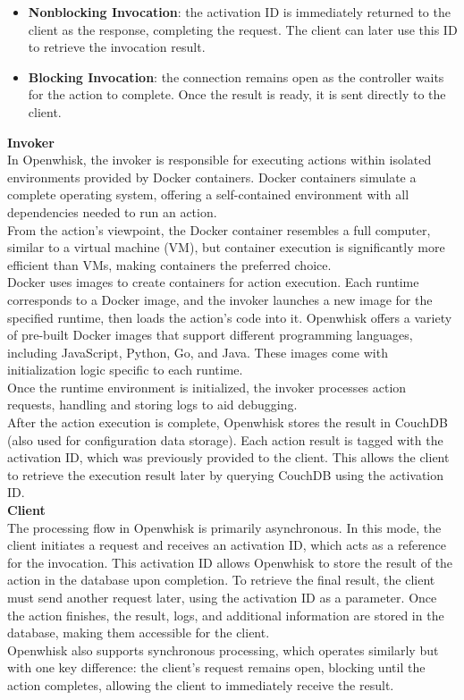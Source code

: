 \begin{itemize}
    \item \textbf{Nonblocking Invocation}: the activation ID is immediately returned to the client as the response, completing the request. The client can later use this ID to retrieve the invocation result.
    \item \textbf{Blocking Invocation}: the connection remains open as the controller waits for the action to complete. Once the result is ready, it is sent directly to the client.
\end{itemize}
\vspace{5pt}
\textbf{Invoker}\\
In Openwhisk, the invoker is responsible for executing actions within isolated environments provided by Docker containers. Docker containers simulate a complete operating system, offering a self-contained environment with all dependencies needed to run an action.\vspace{14pt}\\
From the action’s viewpoint, the Docker container resembles a full computer, similar to a virtual machine (VM), but container execution is significantly more efficient than VMs, making containers the preferred choice.\\
Docker uses images to create containers for action execution. Each runtime corresponds to a Docker image, and the invoker launches a new image for the specified runtime, then loads the action’s code into it. Openwhisk offers a variety of pre-built Docker images that support different programming languages, including JavaScript, Python, Go, and Java. These images come with initialization logic specific to each runtime.\\
Once the runtime environment is initialized, the invoker processes action requests, handling and storing logs to aid debugging.\vspace{14pt}\\
After the action execution is complete, Openwhisk stores the result in CouchDB (also used for configuration data storage). Each action result is tagged with the activation ID, which was previously provided to the client. This allows the client to retrieve the execution result later by querying CouchDB using the activation ID.\vspace{14pt}\\
\textbf{Client}\\
The processing flow in Openwhisk is primarily asynchronous. In this mode, the client initiates a request and receives an activation ID, which acts as a reference for the invocation. This activation ID allows Openwhisk to store the result of the action in the database upon completion. To retrieve the final result, the client must send another request later, using the activation ID as a parameter. Once the action finishes, the result, logs, and additional information are stored in the database, making them accessible for the client.\vspace{14pt}\\
Openwhisk also supports synchronous processing, which operates similarly but with one key difference: the client’s request remains open, blocking until the action completes, allowing the client to immediately receive the result.\cite{sciabarra2019learning}